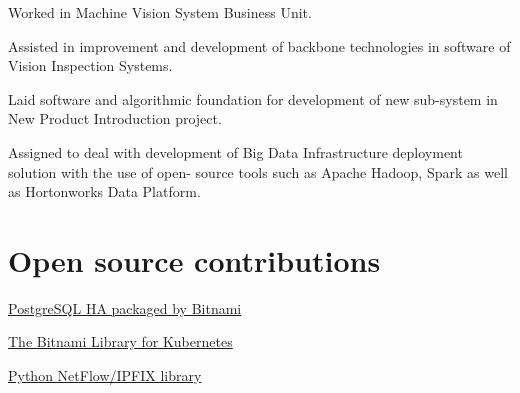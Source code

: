 \documentclass[letterpaper]{deedy-resume} %
\begin{document}
\begin{minipage}[t]{0.66\textwidth}
\sectionspace %


\begin{tightitemize}
\item Worked in Machine Vision System Business Unit.
\item Assisted in improvement and development of backbone technologies in software of Vision Inspection Systems.
\item Laid software and algorithmic foundation for development of new sub-system in New Product Introduction project.
\end{tightitemize}

\sectionspace %


\begin{tightitemize}
\item Assigned to deal with development of Big Data Infrastructure deployment solution with the use of open-
source tools such as Apache Hadoop, Spark as well as Hortonworks Data Platform.
\end{tightitemize}

\sectionspace %

\section{Open source contributions}
\vspace{\topsep}
\begin{tightitemize}
\item \href{https://github.com/bitnami/bitnami-docker-postgresql-repmgr}{PostgreSQL HA packaged by Bitnami}
\item \href{https://github.com/bitnami/charts}{The Bitnami Library for Kubernetes}
\item \href{https://github.com/bitkeks/python-netflow-v9-softflowd}{Python NetFlow/IPFIX library}
\end{tightitemize}


\end{minipage} %

\end{document}
